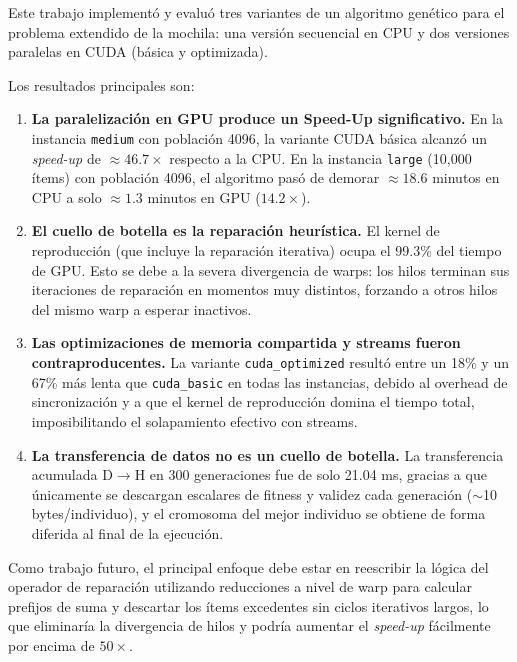 Este trabajo implementó y evaluó tres variantes de un algoritmo genético para el
problema extendido de la mochila: una versión secuencial en CPU y dos versiones
paralelas en CUDA (básica y optimizada).

Los resultados principales son:

\begin{enumerate}
  \item \textbf{La paralelización en GPU produce un Speed-Up significativo.} En la instancia \texttt{medium} con población 4096, la variante CUDA básica alcanzó un \emph{speed-up} de $\approx 46.7\times$ respecto a la CPU. En la instancia \texttt{large} (10,000 ítems) con población 4096, el algoritmo pasó de demorar $\approx 18.6$ minutos en CPU a solo $\approx 1.3$ minutos en GPU ($14.2\times$).
  
  \item \textbf{El cuello de botella es la reparación heurística.} El kernel de reproducción (que incluye la reparación iterativa) ocupa el 99.3\% del tiempo de GPU. Esto se debe a la severa divergencia de warps: los hilos terminan sus iteraciones de reparación en momentos muy distintos, forzando a otros hilos del mismo warp a esperar inactivos.
  
  \item \textbf{Las optimizaciones de memoria compartida y streams fueron contraproducentes.} La variante \texttt{cuda\_optimized} resultó entre un 18\% y un 67\% más lenta que \texttt{cuda\_basic} en todas las instancias, debido al overhead de sincronización y a que el kernel de reproducción domina el tiempo total, imposibilitando el solapamiento efectivo con streams.
  
  \item \textbf{La transferencia de datos no es un cuello de botella.} La transferencia acumulada D$\to$H en 300 generaciones fue de solo 21.04 ms, gracias a que únicamente se descargan escalares de fitness y validez cada generación ($\sim$10 bytes/individuo), y el cromosoma del mejor individuo se obtiene de forma diferida al final de la ejecución.
\end{enumerate}

Como trabajo futuro, el principal enfoque debe estar en reescribir la lógica del operador de reparación utilizando reducciones a nivel de warp para calcular prefijos de suma y descartar los ítems excedentes sin ciclos iterativos largos, lo que eliminaría la divergencia de hilos y podría aumentar el \emph{speed-up} fácilmente por encima de $50\times$.